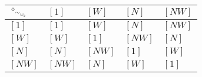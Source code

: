 \begin{tabularx}{0.6\textwidth}{l|llll}
$\circ_{\sim_{w_{2}}}$ & $[1]$ & $[W]$ & $[N]$ & $[NW]$ \\
\hline
$[1]$ & $[1]$ & $[W]$ & $[N]$ & $[NW]$ \\
$[W]$ & $[W]$ & $[1]$ & $[NW]$ & $[N]$ \\
$[N]$ & $[N]$ & $[NW]$ & $[1]$ & $[W]$ \\
$[NW]$ & $[NW]$ & $[N]$ & $[W]$ & $[1]$ \\
\end{tabularx}
